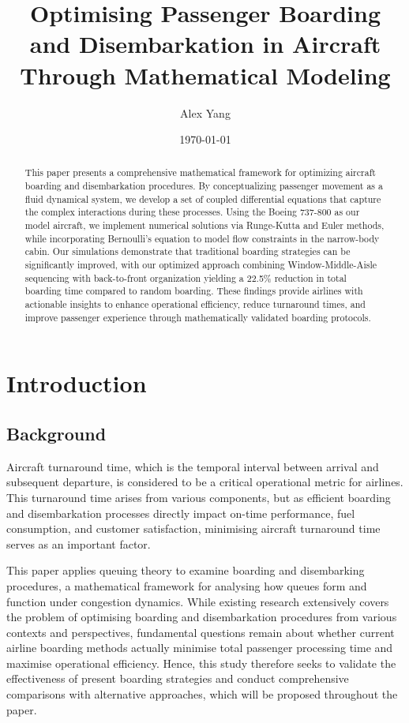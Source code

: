 \documentclass[a4paper,12pt]{article}
\title{Optimising Passenger Boarding and Disembarkation in Aircraft Through Mathematical Modeling}
\author{Alex Yang}
\date{\today}
\begin{document}
\maketitle

\begin{abstract}
This paper presents a comprehensive mathematical framework for optimizing aircraft boarding and disembarkation procedures. By conceptualizing passenger movement as a fluid dynamical system, we develop a set of coupled differential equations that capture the complex interactions during these processes. Using the Boeing 737-800 as our model aircraft, we implement numerical solutions via Runge-Kutta and Euler methods, while incorporating Bernoulli's equation to model flow constraints in the narrow-body cabin. Our simulations demonstrate that traditional boarding strategies can be significantly improved, with our optimized approach combining Window-Middle-Aisle sequencing with back-to-front organization yielding a 22.5\% reduction in total boarding time compared to random boarding. These findings provide airlines with actionable insights to enhance operational efficiency, reduce turnaround times, and improve passenger experience through mathematically validated boarding protocols.
\end{abstract}

\section{Introduction}

\subsection{Background}

Aircraft turnaround time, which is the temporal interval between arrival and subsequent departure, is considered to be a critical operational metric for airlines. This turnaround time arises from various components, but as efficient boarding and disembarkation processes directly impact on-time performance, fuel consumption, and customer satisfaction, minimising aircraft turnaround time serves as an important factor.

This paper applies queuing theory to examine boarding and disembarking procedures, a mathematical framework for analysing how queues form and function under congestion dynamics. While existing research extensively covers the problem of optimising boarding and disembarkation procedures from various contexts and perspectives, fundamental questions remain about whether current airline boarding methods actually minimise total passenger processing time and maximise operational efficiency. Hence, this study therefore seeks to validate the effectiveness of present boarding strategies and conduct comprehensive comparisons with alternative approaches, which will be proposed throughout the paper.
\end{document}
